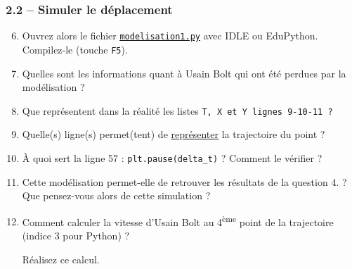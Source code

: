 \documentclass[11pt]{article}
\begin{document}
 \subsubsection*{2.2 -- Simuler le déplacement}
\begin{enumerate}
 \setcounter{enumi}{5}
 
 \item Ouvrez alors le fichier \href{https://github.com/formationPythonPC/formation20-21/tree/master/activites-2nde/2-tp-bolt/modelisation1.py}{\underline{\texttt{modelisation1.py}}} avec IDLE ou EduPython. Compilez-le (touche \texttt{F5}).
 
 \smallskip
 \item \ar Quelles sont les informations quant à Usain Bolt qui ont été perdues par la modélisation ? 
 
 \medskip
 \item \app \com Que représentent dans la réalité les listes \tt{T}, \tt{X} et \tt{Y} lignes 9-10-11 ?
 
 \begin{center}
 \end{center}
 
 
  \medskip
  
  \item\app Quelle(s) ligne(s) permet(tent) de \underline{représenter} la trajectoire du point ? 
  
 \medskip
 \item \ar \va À quoi sert la ligne 57 : \texttt{plt.pause(delta\_t)} ? Comment le vérifier ?%

 \medskip
\item \va Cette modélisation permet-elle de retrouver les résultats de la question 4. ? Que pensez-vous alors de cette simulation ? 
 
 \medskip
 
 \item \ar \rea Comment calculer la vitesse d'Usain Bolt au 4\textsuperscript{ème} point de la trajectoire (indice 3 pour Python) ? 
 
 Réalisez ce calcul.  
 \cpdepce

 \begin{center}
 \end{center}
 

\end{enumerate}
\end{document}

